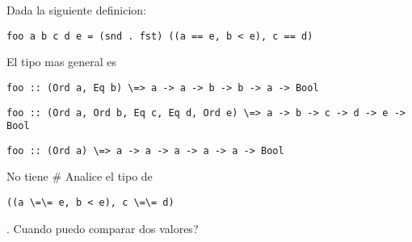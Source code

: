 \documentclass{gift}
\begin{document}
\begin{giftComentario}
  
\end  {giftComentario}
\begin{giftFragmento}
Dada la siguiente definicion:\end  {giftFragmento}

\verb!foo a b c d e = (snd . fst) ((a == e, b < e), c == d)!
\begin{giftFragmento}
El tipo mas general es\end  {giftFragmento}


\begin{giftMO}
\item \begin{giftFragmento}
\end  {giftFragmento}

\verb!foo :: (Ord a, Eq b) \=> a -> a -> b -> b -> a -> Bool!
\begin{giftFragmento}
\end  {giftFragmento}


\item \begin{giftFragmento}
\end  {giftFragmento}

\verb!foo :: (Ord a, Ord b, Eq c, Eq d, Ord e) \=> a -> b -> c -> d -> e -> Bool!
\begin{giftFragmento}
\end  {giftFragmento}


\item \begin{giftFragmento}
\end  {giftFragmento}

\verb!foo :: (Ord a) \=> a -> a -> a -> a -> a -> Bool!
\begin{giftFragmento}
\end  {giftFragmento}


\item \begin{giftFragmento}
No tiene  # Analice el tipo de\end  {giftFragmento}

\verb!((a \=\= e, b < e), c \=\= d)!
\begin{giftFragmento}
. Cuando puedo comparar dos valores?\end  {giftFragmento}


\end  {giftMO}
\end{document}
